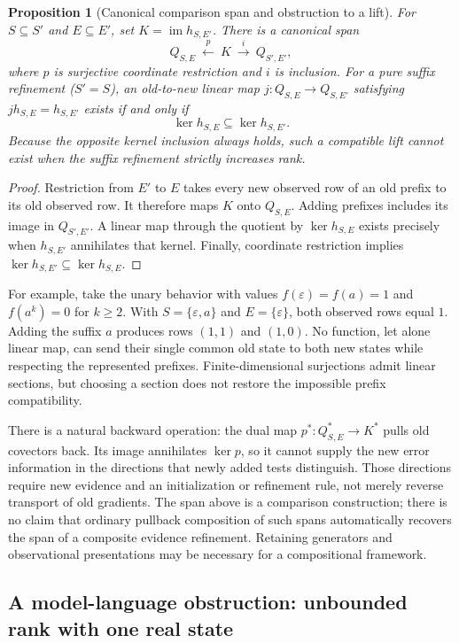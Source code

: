 \documentclass[11pt]{article}
\newtheorem{proposition}[theorem]{Proposition}
\theoremstyle{definition}
\theoremstyle{remark}
\begin{document}
\begin{proposition}[Canonical comparison span and obstruction to a lift]
\label{ce:refinement-span}
For $S\subseteq S'$ and $E\subseteq E'$, set
$K=\operatorname{im}h_{S,E'}$. There is a canonical span
\[
 Q_{S,E}\ \xleftarrow{\ p\ }\ K\ \xrightarrow{\ i\ }\ Q_{S',E'},
\]
where $p$ is surjective coordinate restriction and $i$ is inclusion.
For a pure suffix refinement ($S'=S$), an old-to-new linear map
$j:Q_{S,E}\to Q_{S,E'}$ satisfying
$j h_{S,E}=h_{S,E'}$ exists if and only if
\[
 \ker h_{S,E}\subseteq\ker h_{S,E'}.
\]
Because the opposite kernel inclusion always holds, such a compatible lift
cannot exist when the suffix refinement strictly increases rank.
\end{proposition}
\begin{proof}
Restriction from $E'$ to $E$ takes every new observed row of an old prefix
to its old observed row. It therefore maps $K$ onto $Q_{S,E}$.
Adding prefixes includes its image in $Q_{S',E'}$. A linear map through
the quotient by $\ker h_{S,E}$ exists precisely when $h_{S,E'}$
annihilates that kernel. Finally, coordinate restriction implies
$\ker h_{S,E'}\subseteq\ker h_{S,E}$.
\end{proof}

For example, take the unary behavior with values
$f(\varepsilon)=f(a)=1$ and $f(a^k)=0$ for $k\geq2$.
With $S=\{\varepsilon,a\}$ and $E=\{\varepsilon\}$, both observed
rows equal $1$. Adding the suffix $a$ produces rows $(1,1)$ and $(1,0)$.
No function, let alone linear map, can send their single common old state
to both new states while respecting the represented prefixes.
Finite-dimensional surjections admit linear sections, but choosing a
section does not restore the impossible prefix compatibility.

There is a natural backward operation: the dual map
$p^*:Q_{S,E}^*\to K^*$ pulls old covectors back. Its image annihilates
$\ker p$, so it cannot supply the new error information in the directions
that newly added tests distinguish. Those directions require new evidence
and an initialization or refinement rule, not merely reverse transport of
old gradients. The span above is a comparison construction; there is no
claim that ordinary pullback composition of such spans automatically
recovers the span of a composite evidence refinement. Retaining generators
and observational presentations may be necessary for a compositional
framework.


\subsection{A model-language obstruction: unbounded rank with one real state}
\label{ce:nonlinear-scope}
\end{document}
